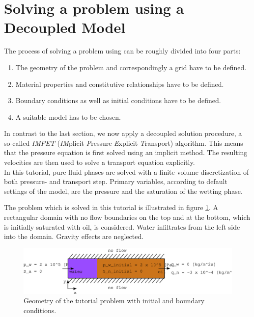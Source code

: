 \section[Decoupled model]{Solving a problem using a Decoupled Model}\label{tutorial-decoupled}
The process of solving a problem using \Dumux can be roughly divided into four parts: 
\begin{enumerate}
 \item The geometry of the problem and correspondingly a grid have to be defined.
 \item Material properties and constitutive relationships have to be defined.
 \item Boundary conditions as well as initial conditions have to be defined.
 \item A suitable model has to be chosen.
\end{enumerate}

In contrast to the last section, we now apply a decoupled solution procedure, a
so-called \textit{IMPET} (\textit{IM}plicit \textit{P}ressure \textit{E}xplicit 
\textit{T}ransport) algorithm. This means that the pressure equation is first 
solved using an implicit method. The resulting velocities are then used to solve
a transport equation explicitly.\\
In this tutorial, pure fluid phases are solved with a finite volume discretization
of both pressure- and transport step. Primary variables, according to default
settings of the model, are the pressure and the saturation of the wetting phase.

The problem which is solved in this tutorial is illustrated in figure 
\ref{tutorial-decoupled:problemfigure}. A rectangular domain with no flow 
boundaries on the top and at the bottom, which is initially saturated with oil, 
is considered. Water infiltrates from the left side into the domain. Gravity 
effects are neglected.

\begin{figure}[ht]
\centering
\includegraphics[width=0.9\linewidth,keepaspectratio]{EPS/tutorial-problemconfiguration}
\caption{Geometry of the tutorial problem with initial and boundary conditions.}\label{tutorial-decoupled:problemfigure}
\end{figure}

